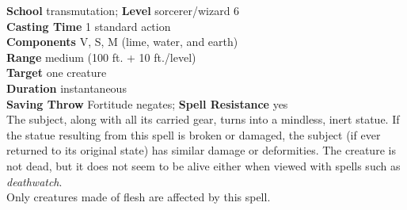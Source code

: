 \textbf{School} transmutation; \textbf{Level} sorcerer/wizard 6\\
\textbf{Casting Time} 1 standard action\\
\textbf{Components} V, S, M (lime, water, and earth)\\
\textbf{Range }medium (100 ft. + 10 ft./level)\\
\textbf{Target} one creature\\
\textbf{Duration} instantaneous\\
\textbf{Saving Throw} Fortitude negates; \textbf{Spell Resistance} yes\\
The subject, along with all its carried gear, turns into a mindless, inert statue. If the statue resulting from this spell is broken or damaged, the subject (if ever returned to its original state) has similar damage or deformities. The creature is not dead, but it does not seem to be alive either when viewed with spells such as \textit{deathwatch}.\\
Only creatures made of flesh are affected by this spell.\\
